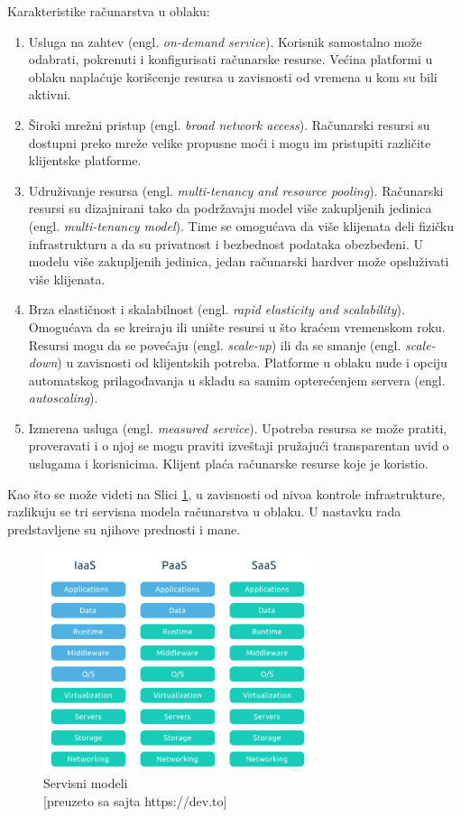 \documentclass[12pt,oneside]{memoir}
\begin{document}
Karakteristike računarstva u oblaku:
\begin{enumerate}
  \item Usluga na zahtev (engl. \emph{on-demand service}). Korisnik samostalno može odabrati, pokrenuti i konfigurisati računarske resurse. Većina platformi u oblaku naplaćuje korišcenje resursa u zavisnosti od vremena u kom su bili aktivni.
  \item Široki mrežni pristup (engl. \emph{broad network access}). Računarski resursi su dostupni preko mreže velike propusne moći i mogu im pristupiti različite klijentske platforme.
  \item Udruživanje resursa (engl. \emph{multi-tenancy and resource pooling}). Računarski resursi su dizajnirani tako da podržavaju model više zakupljenih jedinica (engl. \emph{multi-tenancy model}). Time se omogućava da više klijenata deli fizičku infrastrukturu a da su privatnost i bezbednost podataka obezbeđeni. U modelu više zakupljenih jedinica, jedan računarski hardver može opsluživati više klijenata.
  \item Brza elastičnost i skalabilnost (engl. \emph{rapid elasticity and scalability}). Omogućava da se kreiraju ili unište resursi u što kraćem vremenskom roku. Resursi mogu da se povećaju (engl. \emph{scale-up}) ili da se smanje (engl. \emph{scale-down}) u zavisnosti od klijentskih potreba. Platforme u oblaku nude i opciju automatskog prilagođavanja u skladu sa samim opterećenjem servera (engl. \emph{autoscaling}).
  \item Izmerena usluga (engl. \emph{measured service}). Upotreba resursa se može pratiti, proveravati i o njoj se mogu praviti izveštaji pružajući transparentan uvid o uslugama i korisnicima. Klijent plaća računarske resurse koje je koristio.
\end{enumerate}

Kao što se može videti na Slici \ref{fig:servisniModeli}, u zavisnosti od nivoa kontrole infrastrukture, razlikuju se tri servisna modela računarstva u oblaku. U nastavku rada predstavljene su njihove prednosti i mane.

\begin{figure}[!ht]
  \centering
  \includegraphics[width=0.7\textwidth]{Slika 5.png}
  \caption{Servisni modeli\\\footnotesize[preuzeto sa sajta https://dev.to]}
  \label{fig:servisniModeli}
\end{figure}
 
\end{document}
